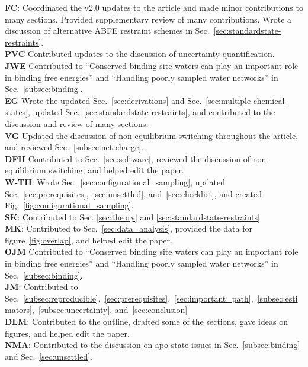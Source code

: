 \documentclass[9pt,bestpractices]{livecoms}
\begin{document}
\textbf{FC}: Coordinated the v2.0 updates to the article and made minor contributions to many sections. Provided supplementary review of many contributions. Wrote a discussion of alternative ABFE restraint schemes in Sec.~\ref{sec:standardstate-restraints}.\\
\textbf{PVC} Contributed updates to the discussion of uncertainty quantification.\\
\textbf{JWE} Contributed to ``Conserved binding site waters can play an important role in binding free energies'' and ``Handling poorly sampled water networks'' in Sec.~\ref{subsec:binding}.\\
\textbf{EG} Wrote the updated Sec.~\ref{sec:derivations} and Sec.~\ref{sec:multiple-chemical-states},  updated Sec.~\ref{sec:standardstate-restraints}, and contributed to the discussion and review of many sections.\\
\textbf{VG} Updated the discussion of non-equilibrium switching throughout the article, and reviewed Sec.~\ref{subsec:net charge}.\\
\textbf{DFH} Contributed to Sec.~\ref{sec:software}, reviewed the discussion of non-equilibrium switching, and helped edit the paper.\\
\textbf{W-TH}: Wrote Sec.~\ref{sec:configurational_sampling}, updated Sec.~\ref{sec:prerequisites},~\ref{sec:unsettled}, and~\ref{sec:checklist}, and created Fig.~\ref{fig:configurational_sampling}.\\
\textbf{SK}: Contributed to Sec. \ref{sec:theory} and \ref{sec:standardstate-restraints}  \\
\textbf{MK}: Contributed to Sec.~\ref{sec:data_analysis}, provided the data for figure~\ref{fig:overlap}, and helped edit the paper.\\
\textbf{OJM} Contributed to ``Conserved binding site waters can play an important role in binding free energies'' and ``Handling poorly sampled water networks'' in Sec.~\ref{subsec:binding}.\\
\textbf{JM}: Contributed to Sec.~\ref{subsec:reproducible},~\ref{sec:prerequisites},~\ref{sec:important_path},~\ref{subsec:estimators},~\ref{subsec:uncertainty}, and~\ref{sec:conclusion}\\
\textbf{DLM}: Contributed to the outline, drafted some of the sections, gave ideas on figures, and helped edit the paper.\\
\textbf{NMA}: Contributed to the discussion on apo state issues in Sec.~\ref{subsec:binding} and Sec.~\ref{sec:unsettled}.\\
\end{document}
